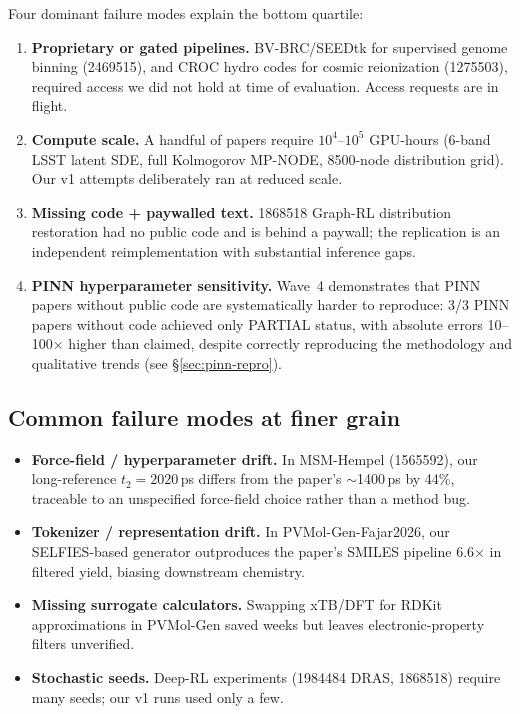 \noindent Four dominant failure modes explain the bottom quartile:
\begin{enumerate}
\item \textbf{Proprietary or gated pipelines.} BV-BRC/SEEDtk for supervised
genome binning (2469515), and CROC hydro codes for cosmic reionization
(1275503), required access we did not hold at time of evaluation. Access
requests are in flight.
\item \textbf{Compute scale.} A handful of papers require $10^4$--$10^5$
GPU-hours (6-band LSST latent SDE, full Kolmogorov MP-NODE, 8500-node
distribution grid). Our v1 attempts deliberately ran at reduced scale.
\item \textbf{Missing code + paywalled text.} 1868518 Graph-RL distribution
restoration had no public code and is behind a paywall; the replication is an
independent reimplementation with substantial inference gaps.
\item \textbf{PINN hyperparameter sensitivity.} Wave~4 demonstrates that PINN
papers without public code are systematically harder to reproduce: 3/3 PINN
papers without code achieved only PARTIAL status, with absolute errors
10--100$\times$ higher than claimed, despite correctly reproducing the
methodology and qualitative trends (see \S\ref{sec:pinn-repro}).
\end{enumerate}

\subsection{Common failure modes at finer grain}
\begin{itemize}
\item \textbf{Force-field / hyperparameter drift.} In MSM-Hempel (1565592),
our long-reference $t_2=2020$\,ps differs from the paper's $\sim$1400\,ps by
44\%, traceable to an unspecified force-field choice rather than a method bug.
\item \textbf{Tokenizer / representation drift.} In PVMol-Gen-Fajar2026, our
SELFIES-based generator outproduces the paper's SMILES pipeline 6.6$\times$ in
filtered yield, biasing downstream chemistry.
\item \textbf{Missing surrogate calculators.} Swapping xTB/DFT for RDKit
approximations in PVMol-Gen saved weeks but leaves electronic-property filters
unverified.
\item \textbf{Stochastic seeds.} Deep-RL experiments (1984484 DRAS, 1868518)
require many seeds; our v1 runs used only a few.
\end{itemize}

